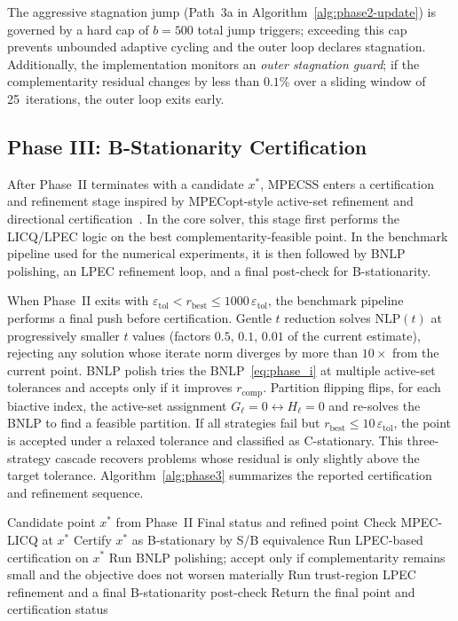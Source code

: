 The aggressive stagnation jump (Path~3a in Algorithm~\ref{alg:phase2-update})
is governed by a hard cap of $b = 500$ total jump triggers; exceeding
this cap prevents unbounded adaptive cycling and the outer loop
declares stagnation. Additionally, the implementation monitors an
\emph{outer stagnation guard}; if the complementarity residual changes
by less than $0.1\%$ over a sliding window of 25~iterations, the outer
loop exits early. 

\subsection{Phase III: B-Stationarity Certification}
\label{sec:phase_iii}
After Phase~II terminates with a candidate $x^*$, MPECSS enters a
certification and refinement stage inspired by MPECopt-style active-set
refinement and directional certification~\cite{NurkanovicLeyffer2025}.
In the core solver, this stage first performs the LICQ/LPEC logic on
the best complementarity-feasible point. In the benchmark pipeline used
for the numerical experiments, it is then followed by BNLP polishing, an
LPEC refinement loop, and a final post-check for B-stationarity.

When Phase~II exits with $\varepsilon_{\mathrm{tol}} < r_{\mathrm{best}}
\leq 1000\,\varepsilon_{\mathrm{tol}}$, the benchmark pipeline performs
a final push before certification. Gentle $t$ reduction solves
$\mathrm{NLP}(t)$ at progressively smaller $t$ values (factors $0.5$,
$0.1$, $0.01$ of the current estimate), rejecting any solution whose
iterate norm diverges by more than $10\times$ from the current point.
BNLP polish tries the BNLP~\eqref{eq:phase_i} at multiple active-set
tolerances and accepts only if it improves $r_{\mathrm{comp}}$.
Partition flipping flips, for each biactive index, the active-set
assignment $G_\ell = 0 \leftrightarrow H_\ell = 0$ and re-solves the
BNLP to find a feasible partition. If all strategies fail but
$r_{\mathrm{best}} \leq 10\,\varepsilon_{\mathrm{tol}}$, the point is accepted under a
relaxed tolerance and classified as C-stationary. This three-strategy
cascade recovers problems whose residual is only slightly
above the target tolerance. Algorithm~\ref{alg:phase3} summarizes the reported certification and
refinement sequence.

\begin{algorithm}[H]
\caption{Phase~III B-Stationarity Certification and Refinement}
\label{alg:phase3}
\begin{algorithmic}[1]
\Require Candidate point $x^*$ from Phase~II
\Ensure Final status and refined point
  \State Check MPEC-LICQ at $x^*$
    \State Certify $x^*$ as B-stationary by S/B equivalence
  \Else
    \State Run LPEC-based certification on $x^*$
  \EndIf
\EndIf
\State Run BNLP polishing; accept only if complementarity remains small and the objective does not worsen materially
\State Run trust-region LPEC refinement and a final B-stationarity post-check
\State Return the final point and certification status
\end{algorithmic}
\end{algorithm}

